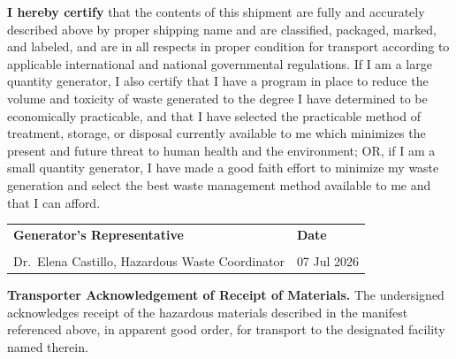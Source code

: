 

\vspace{4pt}

\begin{tcolorbox}[signoffbox]
  \small
  \textbf{I hereby certify} that the contents of this shipment are fully
  and accurately described above by proper shipping name and are
  classified, packaged, marked, and labeled, and are in all respects in
  proper condition for transport according to applicable international
  and national governmental regulations. If I am a large quantity
  generator, I also certify that I have a program in place to reduce the
  volume and toxicity of waste generated to the degree I have determined
  to be economically practicable, and that I have selected the practicable
  method of treatment, storage, or disposal currently available to me
  which minimizes the present and future threat to human health and the
  environment; OR, if I am a small quantity generator, I have made a good
  faith effort to minimize my waste generation and select the best waste
  management method available to me and that I can afford.
\end{tcolorbox}

\vspace{10pt}

\noindent
\begin{tabularx}{\linewidth}{@{} X X @{}}
  \textbf{Generator's Representative} & \textbf{Date} \\[16pt]
  \hrulefill & \hrulefill \\[4pt]
  Dr.\ Elena Castillo, Hazardous Waste Coordinator & 07 Jul 2026 \\
\end{tabularx}

\vspace{14pt}


\vspace{6pt}

\begin{tcolorbox}[signoffbox]
  \small
  \textbf{Transporter Acknowledgement of Receipt of Materials.} The
  undersigned acknowledges receipt of the hazardous materials described
  in the manifest referenced above, in apparent good order, for transport
  to the designated facility named therein.
\end{tcolorbox}

